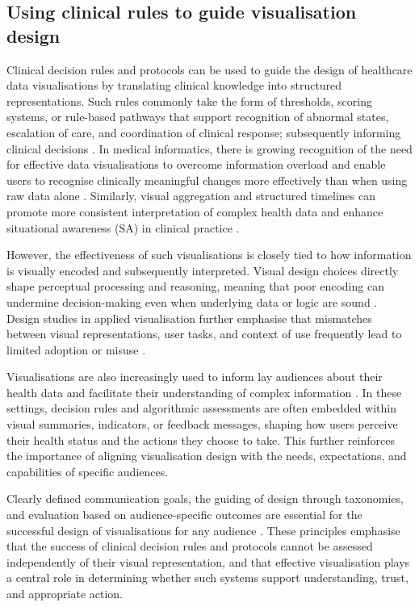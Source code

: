 \documentclass[
  10pt,
  letterpaper,
]{article}
\begin{document}
\subsection{Using clinical rules to guide visualisation
design}\label{sec-clinical-rules}

Clinical decision rules and protocols can be used to guide the design of
healthcare data visualisations by translating clinical knowledge into
structured representations. Such rules commonly take the form of
thresholds, scoring systems, or rule-based pathways that support
recognition of abnormal states, escalation of care, and coordination of
clinical response; subsequently informing clinical decisions
\cite{sutton_overview_2020}. In medical informatics, there is growing
recognition of the need for effective data visualisations to overcome
information overload and enable users to recognise clinically meaningful
changes more effectively than when using raw data alone
\citep{aigner_2008}. Similarly, visual aggregation and structured
timelines can promote more consistent interpretation of complex health
data \cite{ledesma_health_2019} and enhance situational awareness (SA)
in clinical practice \citep{dixit_2020}.

However, the effectiveness of such visualisations is closely tied to how
information is visually encoded and subsequently interpreted. Visual
design choices directly shape perceptual processing and reasoning,
meaning that poor encoding can undermine decision-making even when
underlying data or logic are sound \cite{ware2012}. Design studies in
applied visualisation further emphasise that mismatches between visual
representations, user tasks, and context of use frequently lead to
limited adoption or misuse \cite{sedlmair_design_2012}.

Visualisations are also increasingly used to inform lay audiences about
their health data and facilitate their understanding of complex
information \citep{arcia_2024}. In these settings, decision rules and
algorithmic assessments are often embedded within visual summaries,
indicators, or feedback messages, shaping how users perceive their
health status and the actions they choose to take. This further
reinforces the importance of aligning visualisation design with the
needs, expectations, and capabilities of specific audiences.

Clearly defined communication goals, the guiding of design through
taxonomies, and evaluation based on audience-specific outcomes are
essential for the successful design of visualisations for any audience
\citep{ancker_2024}. These principles emphasise that the success of
clinical decision rules and protocols cannot be assessed independently
of their visual representation, and that effective visualisation plays a
central role in determining whether such systems support understanding,
trust, and appropriate action.
\end{document}
